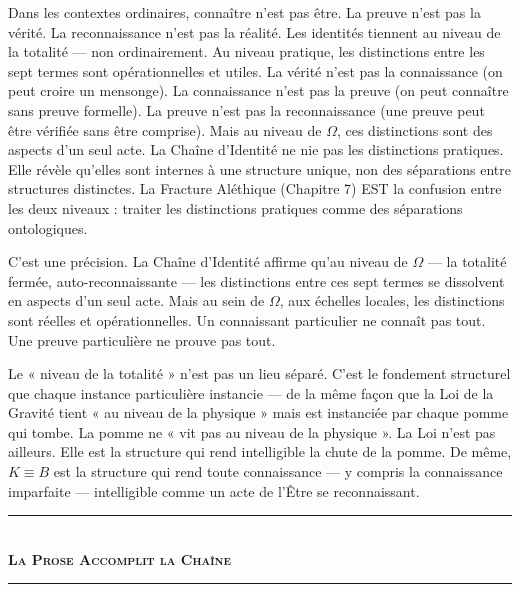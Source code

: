 \documentclass[10pt, openany, oneside]{book}
\renewcommand{\normalsize}{\fontsize{10}{13}\selectfont}
\begin{document}
\vspace{1em}

\noindent Dans les contextes ordinaires, connaître n'est pas être. La preuve n'est pas la vérité. La reconnaissance n'est pas la réalité. Les identités tiennent au niveau de la totalité --- non ordinairement. Au niveau pratique, les distinctions entre les sept termes sont opérationnelles et utiles. La vérité n'est pas la connaissance (on peut croire un mensonge). La connaissance n'est pas la preuve (on peut connaître sans preuve formelle). La preuve n'est pas la reconnaissance (une preuve peut être vérifiée sans être comprise). Mais au niveau de $\Omega$, ces distinctions sont des aspects d'un seul acte. La Chaîne d'Identité ne nie pas les distinctions pratiques. Elle révèle qu'elles sont internes à une structure unique, non des séparations entre structures distinctes. La Fracture Aléthique (Chapitre 7) EST la confusion entre les deux niveaux : traiter les distinctions pratiques comme des séparations ontologiques.

C'est une précision. La Chaîne d'Identité affirme qu'au niveau de $\Omega$ --- la totalité fermée, auto-reconnaissante --- les distinctions entre ces sept termes se dissolvent en aspects d'un seul acte. Mais au sein de $\Omega$, aux échelles locales, les distinctions sont réelles et opérationnelles. Un connaissant particulier ne connaît pas tout. Une preuve particulière ne prouve pas tout.

Le « niveau de la totalité » n'est pas un lieu séparé. C'est le fondement structurel que chaque instance particulière instancie --- de la même façon que la Loi de la Gravité tient « au niveau de la physique » mais est instanciée par chaque pomme qui tombe. La pomme ne « vit pas au niveau de la physique ». La Loi n'est pas ailleurs. Elle est la structure qui rend intelligible la chute de la pomme. De même, $K \equiv B$ est la structure qui rend toute connaissance --- y compris la connaissance imparfaite --- intelligible comme un acte de l'Être se reconnaissant.

\vspace{1.5em}


\begin{center}
    \rule{0.3\textwidth}{0.4pt}\\[0.5em]
    {\normalsize\bfseries\scshape La Prose Accomplit la Chaîne}\\[0.3em]
    \rule{0.3\textwidth}{0.4pt}
\end{center}
\end{document}
